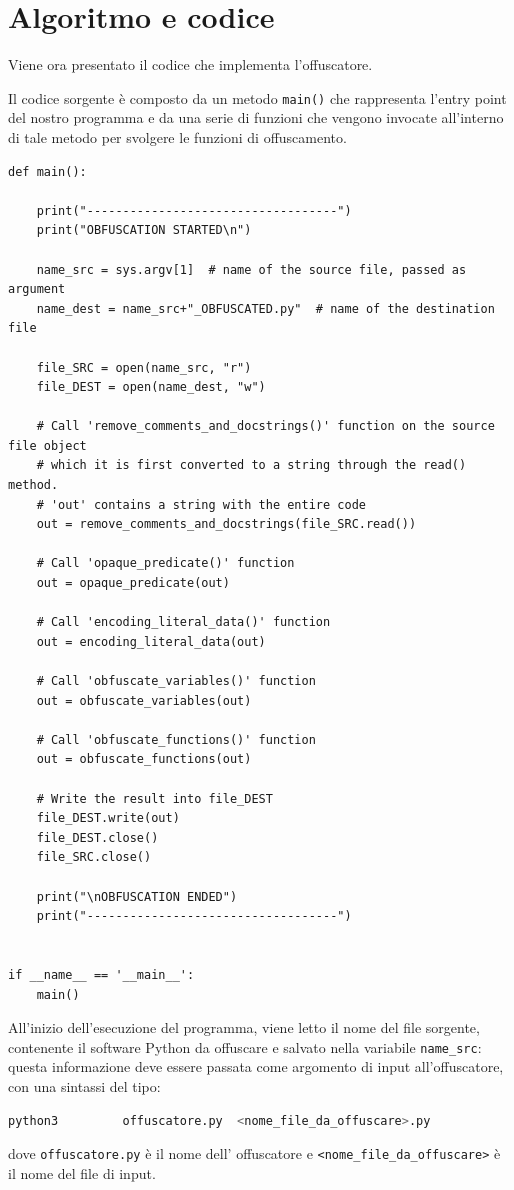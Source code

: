 \documentclass[a4paper,oneside,openright,titlepage,10pt,footinclude,headinclude]{scrbook}
\begin{document}
\section{Algoritmo e codice}\label{offuscatore_algo}
Viene ora presentato il codice che implementa l'offuscatore.\medskip

Il codice sorgente è composto da  un metodo \texttt{main()} che rappresenta l'entry point del nostro programma e da una serie di funzioni  che vengono invocate all'interno di tale metodo per svolgere le funzioni di offuscamento.
\begin{graybox}[innerleftmargin=2,]
\begin{lstlisting}
def main():

    print("-----------------------------------")
    print("OBFUSCATION STARTED\n")

    name_src = sys.argv[1]  # name of the source file, passed as argument
    name_dest = name_src+"_OBFUSCATED.py"  # name of the destination file

    file_SRC = open(name_src, "r")
    file_DEST = open(name_dest, "w")

    # Call 'remove_comments_and_docstrings()' function on the source file object
    # which it is first converted to a string through the read() method.
    # 'out' contains a string with the entire code
    out = remove_comments_and_docstrings(file_SRC.read())   

    # Call 'opaque_predicate()' function
    out = opaque_predicate(out)

    # Call 'encoding_literal_data()' function
    out = encoding_literal_data(out)

    # Call 'obfuscate_variables()' function
    out = obfuscate_variables(out)
    
    # Call 'obfuscate_functions()' function
    out = obfuscate_functions(out)

    # Write the result into file_DEST
    file_DEST.write(out)
    file_DEST.close()
    file_SRC.close()

    print("\nOBFUSCATION ENDED")
    print("-----------------------------------")


if __name__ == '__main__':
    main()
\end{lstlisting}
\end{graybox}

All'inizio dell'esecuzione del programma, viene letto il nome del file sorgente, contenente il software Python da offuscare e salvato nella variabile \texttt{name\_src}: questa informazione deve essere passata come argomento di input all'offuscatore, con una sintassi del tipo:
\begin{graybox}
\begin{lstlisting}[language=bash,basicstyle=\fontsize{10}{9}\selectfont,]
python3  		offuscatore.py 	<nome_file_da_offuscare>.py
\end{lstlisting}
\end{graybox}
\noindent dove \texttt{offuscatore.py} è il nome dell' offuscatore e \texttt{<nome\_file\_da\_offuscare>} è il nome del file di input.
\end{document}
